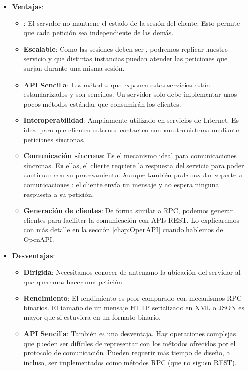 \begin{itemize}
  \item \textbf{Ventajas}:

  \begin{itemize}
    \item \textbf{}: El servidor no mantiene el estado de la sesión del cliente. Esto permite que cada petición sea independiente de las demás.

    \item \textbf{Escalable}: Como las sesiones deben ser , podremos replicar nuestro servicio y que distintas instancias puedan atender las peticiones que surjan durante una misma sesión.

    \item \textbf{API Sencilla}: Los métodos que exponen estos servicios están estandarizados y son sencillos. Un servidor solo debe implementar unos pocos métodos estándar que consumirán los clientes.

    \item \textbf{Interoperabilidad}: Ampliamente utilizado en servicios de Internet. Es ideal para que clientes externos contacten con nuestro sistema mediante peticiones síncronas. \cite{newmanBuildingMicroservicesDesigning2021}

    \item \textbf{Comunicación síncrona}: Es el mecanismo ideal para comunicaciones síncronas. En ellas, el cliente requiere la respuesta del servicio para poder continuar con su procesamiento. Aunque también podemos dar soporte a comunicaciones : el cliente envía un mensaje y no espera ninguna respuesta a su petición.

    \item \textbf{Generación de clientes}: De forma similar a RPC, podemos generar clientes para facilitar la comunicación con APIs REST. Lo explicaremos con más detalle en la sección \ref{chap:OpenAPI} cuando hablemos de OpenAPI.
  \end{itemize}

  \item \textbf{Desventajas}:

  \begin{itemize}
    \item \textbf{Dirigida}: Necesitamos conocer de antemano la ubicación del servidor al que queremos hacer una petición.

    \item \textbf{Rendimiento}: El rendimiento es peor comparado con mecanismos RPC binarios. El tamaño de un mensaje HTTP serializado en XML o JSON es mayor que si estuviera en un formato binario.

    \item \textbf{API Sencilla}: También es una desventaja. Hay operaciones complejas que pueden ser difíciles de representar con los métodos ofrecidos por el protocolo de comunicación. Pueden requerir más tiempo de diseño, o incluso, ser implementados como métodos RPC (que no siguen REST).
  \end{itemize}
\end{itemize}

